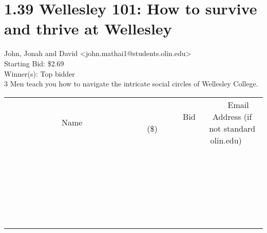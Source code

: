 \documentclass[11pt]{article}
\begin{document}
					\section*{1.39 Wellesley 101: How to survive and thrive at Wellesley}
					John, Jonah and David <john.mathai1@students.olin.edu> \\
					Starting Bid: \$2.69 \\
					Winner(s): Top bidder \\
					3 Men teach you how to navigate the intricate social circles of Wellesley College. \\
					[6ex]
					\begin{tabular}{c c c}
						~~~~~~~~~~~~~Name~~~~~~~~~~~~~ & ~~~~~~~~~Bid (\$)~~~~~~~~~ & ~~~Email Address (if not standard olin.edu)~~~ \\
				
 & & \\
\hline
 & & \\
\hline
 & & \\
\hline
 & & \\
\hline
 & & \\
\hline
 & & \\
\hline
 & & \\
\hline
 & & \\
\hline
 & & \\
\hline
 & & \\
\hline
 & & \\
\hline
 & & \\
\hline
 & & \\
\hline
 & & \\
\hline
 & & \\
\hline
 & & \\
\hline
 & & \\
\hline
 & & \\
\hline
 & & \\
\hline
 & & \\
\hline
 & & \\
\hline
 & & \\
\hline
 & & \\
\hline
 & & \\
\hline
 & & \\
\hline
 & & \\
\hline
					\end{tabular}
					\clearpage
				
\end{document}
